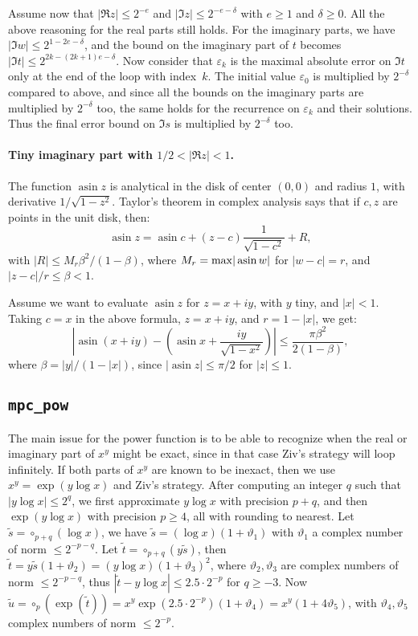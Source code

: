 \documentclass [11pt]{article}
\newcommand {\asin}{\operatorname {asin}}
\newcommand {\round}{\operatorname {\circ}}
\renewcommand {\theta}{\vartheta}
\renewcommand {\leq}{\leqslant}
\renewcommand {\geq}{\geqslant}
\begin{document}
Assume now that $|\Re z| \leq 2^{-e}$ and $|\Im z| \leq 2^{-e-\delta}$ with
$e \geq 1$ and $\delta \geq 0$. All the above reasoning for the real parts still
holds. For the imaginary parts, we have
$|\Im w| \leq 2^{1-2e-\delta}$, and the bound on the imaginary part of $t$
becomes $|\Im t| \leq 2^{2k-(2k+1)e-\delta}$.
Now consider that $\varepsilon_k$ is the maximal absolute error on
$\Im t$ only at the end of the loop with index~$k$.
The initial value $\varepsilon_0$
is multiplied by $2^{-\delta}$ compared to above,
and since all the bounds on the imaginary
parts are multiplied by $2^{-\delta}$ too, the same holds for the recurrence
on $\varepsilon_k$ and their solutions. Thus the final error bound on
$\Im s$ is multiplied by $2^{-\delta}$ too.

\paragraph{Tiny imaginary part with $1/2 < |\Re z| < 1$.}
The function $\asin z$ is analytical in the disk of center $(0,0)$ and
radius $1$, with derivative $1/\sqrt{1-z^2}$.
Taylor's theorem in complex analysis says that if $c,z$ are points in the unit
disk, then:
\[ \asin z = \asin c + (z-c) \frac{1}{\sqrt{1-c^2}} + R, \]
with $|R| \leq M_r \beta^2/(1-\beta)$, where $M_r = {\rm max}|\asin w|$
for $|w-c| = r$, and $|z-c|/r \leq \beta < 1$.

Assume we want to evaluate $\asin z$ for $z = x + iy$, with $y$ tiny,
and $|x| < 1$.
Taking $c=x$ in the above formula, $z = x + iy$, and $r = 1 - |x|$, we get:
\[ \left| \asin(x + iy) - \left( \asin x + \frac{iy}{\sqrt{1-x^2}} \right)
  \right| \leq \frac{\pi \beta^2}{2 (1-\beta)}, \]
where $\beta = |y|/(1-|x|)$,
since $|\asin z| \leq \pi/2$ for $|z| \leq 1$.


\subsection {\texttt {mpc\_pow}}

The main issue for the power function is to be able to recognize when the
real or imaginary part of $x^y$ might be exact, since in that case
Ziv's strategy will loop infinitely.
If both parts of $x^y$ are known to be inexact, then we use
$x^y = \exp(y \log x)$ and Ziv's strategy.
After computing an integer $q$ such that $|y \log x| \leq 2^q$, we first
approximate $y \log x$ with precision $p + q$, and then
$\exp(y \log x)$ with precision $p \geq 4$, all with rounding
to nearest.
Let $\tilde{s} = \round_{p+q}(\log x)$,
we have $\tilde{s} = (\log x) (1 + \theta_1)$
with $\theta_1$ a complex number of norm $\leq 2^{-p-q}$.
Let $\tilde{t} = \round_{p+q}(y \tilde{s})$, then
$\tilde{t} = y \tilde{s} (1 + \theta_2) = (y \log x) (1 + \theta_3)^2$,
where $\theta_2, \theta_3$ are complex numbers of norm $\leq 2^{-p-q}$,
thus $|\tilde{t} - y \log x| \leq 2.5 \cdot 2^{-p}$ for $q \geq -3$.
Now $\tilde{u} = \round_p(\exp(\tilde{t})) =
x^y \exp(2.5 \cdot 2^{-p}) (1 + \theta_4) = x^y (1 + 4 \theta_5)$,
with $\theta_4, \theta_5$ complex numbers of norm $\leq 2^{-p}$.
\end{document}
